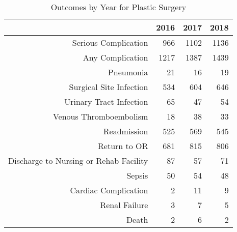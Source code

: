 \begin{table}[ht]
\centering
\begin{tabular}{rrrr}
  \hline
 & 2016 & 2017 & 2018 \\ 
  \hline
Serious Complication & 966 & 1102 & 1136 \\ 
  Any Complication & 1217 & 1387 & 1439 \\ 
  Pneumonia &  21 &  16 &  19 \\ 
  Surgical Site Infection & 534 & 604 & 646 \\ 
  Urinary Tract Infection &  65 &  47 &  54 \\ 
  Venous Thromboembolism &  18 &  38 &  33 \\ 
  Readmission & 525 & 569 & 545 \\ 
  Return to OR & 681 & 815 & 806 \\ 
  Discharge to Nursing or Rehab Facility &  87 &  57 &  71 \\ 
  Sepsis &  50 &  54 &  48 \\ 
  Cardiac Complication &   2 &  11 &   9 \\ 
  Renal Failure &   3 &   7 &   5 \\ 
  Death &   2 &   6 &   2 \\ 
   \hline
\end{tabular}
\caption{Outcomes by Year for Plastic Surgery} 
\end{table}
